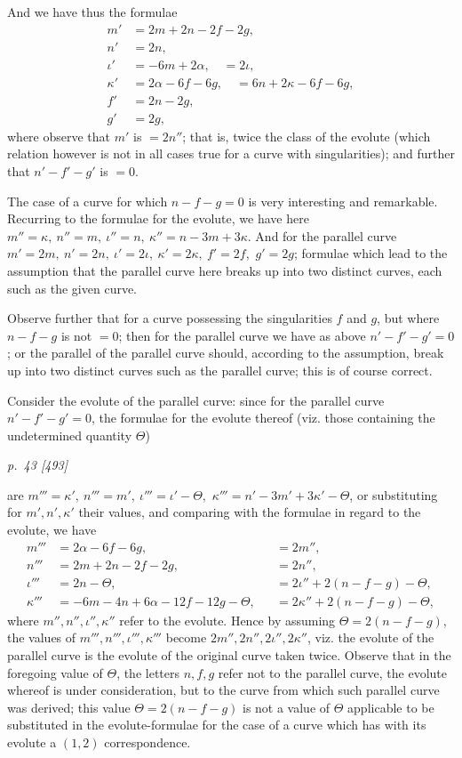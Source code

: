 ﻿\documentclass[11pt,a4paper]{article}
\theoremstyle{plain}
\theoremstyle{definition}
\begin{document}
And we have thus the formulae
\[
\begin{aligned}
m'&=2m+2n-2f-2g,\\
n'&=2n,\\
\iota'&=-6m+2\alpha,\quad =2\iota,\\
\kappa'&=2\alpha-6f-6g,\quad =6n+2\kappa-6f-6g,\\
f'&=2n-2g,\\
g'&=2g,
\end{aligned}
\]
where observe that \(m'\) is \(=2n''\); that is, twice the class of the
evolute (which relation however is not in all cases true for a curve with
singularities); and further that \(n'-f'-g'\) is \(=0\).

The case of a curve for which \(n-f-g=0\) is very interesting and
remarkable. Recurring to the formulae for the evolute, we have here
\(m''=\kappa,\ n''=m,\ \iota''=n,\ \kappa''=n-3m+3\kappa\). And for the
parallel curve \(m'=2m,\ n'=2n,\ \iota'=2\iota,\ \kappa'=2\kappa,\ f'=2f,\)
\(g'=2g\); formulae which lead to the assumption that the parallel curve
here breaks up into two distinct curves, each such as the given curve.

Observe further that for a curve possessing the singularities \(f\) and
\(g\), but where \(n-f-g\) is not \(=0\); then for the parallel curve we
have as above \(n'-f'-g'=0\); or the parallel of the parallel curve should,
according to the assumption, break up into two distinct curves such as the
parallel curve; this is of course correct.

Consider the evolute of the parallel curve: since for the parallel curve
\(n'-f'-g'=0\), the formulae for the evolute thereof (viz. those
containing the undetermined quantity \(\Theta\))

\clearpage
\textit{p.~43 [493]}

are \(m'''=\kappa',\ n'''=m',\ \iota'''=\iota'-\Theta,\)
\(\kappa'''=n'-3m'+3\kappa'-\Theta\), or substituting for \(m',n',\kappa'\)
their values, and comparing with the formulae in regard to the evolute, we
have
\[
\begin{aligned}
m'''&=2\alpha-6f-6g,&&=2m'',\\
n'''&=2m+2n-2f-2g,&&=2n'',\\
\iota'''&=2n-\Theta,&&=2\iota''+2(n-f-g)-\Theta,\\
\kappa'''&=-6m-4n+6\alpha-12f-12g-\Theta,
&&=2\kappa''+2(n-f-g)-\Theta,
\end{aligned}
\]
where \(m'',n'',\iota'',\kappa''\) refer to the evolute. Hence by assuming
\(\Theta=2(n-f-g)\), the values of \(m''',n''',\iota''',\kappa'''\) become
\(2m'',2n'',2\iota'',2\kappa''\), viz. the evolute of the parallel curve
is the evolute of the original curve taken twice. Observe that in the
foregoing value of \(\Theta\), the letters \(n,f,g\) refer not to the
parallel curve, the evolute whereof is under consideration, but to the
curve from which such parallel curve was derived; this value
\(\Theta=2(n-f-g)\) is not a value of \(\Theta\) applicable to be
substituted in the evolute-formulae for the case of a curve which has with
its evolute a \((1,2)\) correspondence.
\end{document}
